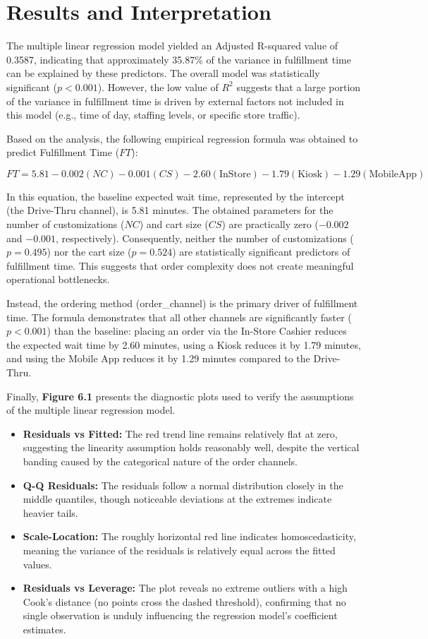 \documentclass[12pt]{report}
\begin{document}
\section{Results and Interpretation}
The multiple linear regression model yielded an Adjusted R-squared value of 0.3587, indicating that approximately 35.87\% of the variance in fulfillment time can be explained by these predictors. The overall model was statistically significant (\(p < 0.001\)). However, the low value of \(R^2\) suggests that a large portion of the variance in fulfillment time is driven by external factors not included in this model (e.g., time of day, staffing levels, or specific store traffic).

Based on the analysis, the following empirical regression formula was obtained to predict Fulfillment Time (\(FT\)):

\[
    FT = 5.81 - 0.002(NC) - 0.001(CS) - 2.60(\text{InStore}) - 1.79(\text{Kiosk}) - 1.29(\text{MobileApp})
\]

In this equation, the baseline expected wait time, represented by the intercept (the Drive-Thru channel), is 5.81 minutes. The obtained parameters for the number of customizations (\(NC\)) and cart size (\(CS\)) are practically zero (\(-0.002\) and \(-0.001\), respectively). Consequently, neither the number of customizations (\(p=0.495\)) nor the cart size (\(p=0.524\)) are statistically significant predictors of fulfillment time. This suggests that order complexity does not create meaningful operational bottlenecks.

Instead, the ordering method (order\_channel) is the primary driver of fulfillment time. The formula demonstrates that all other channels are significantly faster (\(p < 0.001\)) than the baseline: placing an order via the In-Store Cashier reduces the expected wait time by 2.60 minutes, using a Kiosk reduces it by 1.79 minutes, and using the Mobile App reduces it by 1.29 minutes compared to the Drive-Thru.

Finally, \textbf{Figure 6.1} presents the diagnostic plots used to verify the assumptions of the multiple linear regression model.
\begin{itemize}
    \item \textbf{Residuals vs Fitted:} The red trend line remains relatively flat at zero, suggesting the linearity assumption holds reasonably well, despite the vertical banding caused by the categorical nature of the order channels.
    \item \textbf{Q-Q Residuals:} The residuals follow a normal distribution closely in the middle quantiles, though noticeable deviations at the extremes indicate heavier tails.
    \item \textbf{Scale-Location:} The roughly horizontal red line indicates homoscedasticity, meaning the variance of the residuals is relatively equal across the fitted values.
    \item \textbf{Residuals vs Leverage:} The plot reveals no extreme outliers with a high Cook's distance (no points cross the dashed threshold), confirming that no single observation is unduly influencing the regression model's coefficient estimates.
\end{itemize}
\end{document}
